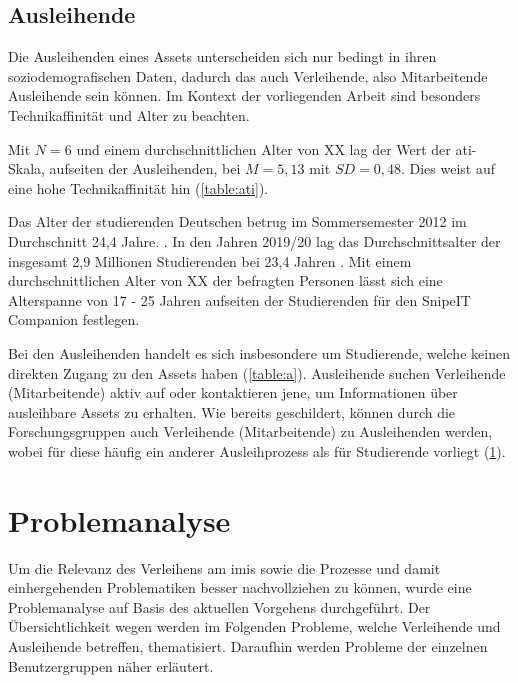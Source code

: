\subsection{Ausleihende}
Die Ausleihenden eines Assets unterscheiden sich nur bedingt in ihren soziodemografischen Daten,
 dadurch das auch Verleihende, also Mitarbeitende Ausleihende sein können.
Im Kontext der vorliegenden Arbeit sind besonders Technikaffinität und Alter zu beachten.

Mit $N=6$ und einem durchschnittlichen Alter von XX lag der Wert der \ac{ati}-Skala, aufseiten der
Ausleihenden, bei $M=5,13$ mit $SD=0,48$. Dies weist auf eine hohe Technikaffinität hin
(\ref{table:ati}).

Das Alter der studierenden Deutschen betrug im Sommersemester 2012 im Durchschnitt 24,4 Jahre.
\cite{middendorff2017wirtschaftliche}. In den Jahren 2019/20 lag das Durchschnittsalter der
insgesamt 2,9 Millionen Studierenden bei 23,4 Jahren \cite{noauthor_studierende_nodate}. Mit einem
durchschnittlichen Alter von XX der befragten Personen lässt sich eine Alterspanne von 17 - 25
Jahren aufseiten der Studierenden für den SnipeIT Companion festlegen.

Bei den Ausleihenden handelt es sich insbesondere um Studierende, welche keinen direkten Zugang zu
den Assets haben (\ref{table:a}). Ausleihende suchen Verleihende (Mitarbeitende) aktiv auf oder
kontaktieren jene, um Informationen über ausleihbare Assets zu erhalten. Wie bereits geschildert,
können durch die Forschungsgruppen auch Verleihende (Mitarbeitende) zu Ausleihenden werden, wobei
für diese häufig ein anderer Ausleihprozess als für Studierende vorliegt (\ref{section:iststand}).


\section{Problemanalyse}
\label{section:iststand}

Um die Relevanz des Verleihens am \ac{imis} sowie die Prozesse und damit einhergehenden
Problematiken besser nachvollziehen zu können, wurde eine Problemanalyse auf Basis des aktuellen
Vorgehens durchgeführt. Der Übersichtlichkeit wegen werden im Folgenden Probleme, welche Verleihende
und Ausleihende betreffen, thematisiert. Daraufhin werden Probleme der einzelnen Benutzergruppen
näher erläutert.

